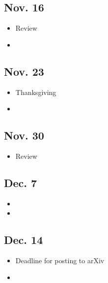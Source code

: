 \documentclass[11pt]{article}
\newenvironment{week}[1]{
\subsection*{#1}
\begin{itemize}
\setlength\itemsep{0mm}
}{
\end{itemize}}
\begin{document}
\begin{multicols}{2}
\begin{week}{Nov. 16}
\item Review
\item {}
\end{week}

\begin{week}{Nov. 23}
\item Thanksgiving
\item {}
\end{week}

\begin{week}{Nov. 30}
\item Review
\end{week}

\begin{week}{Dec. 7}
\item {}
\item {}
\end{week}

\begin{week}{Dec. 14}
\item Deadline for posting to arXiv
\item {}
\end{week}

\end{multicols}
\end{document}
